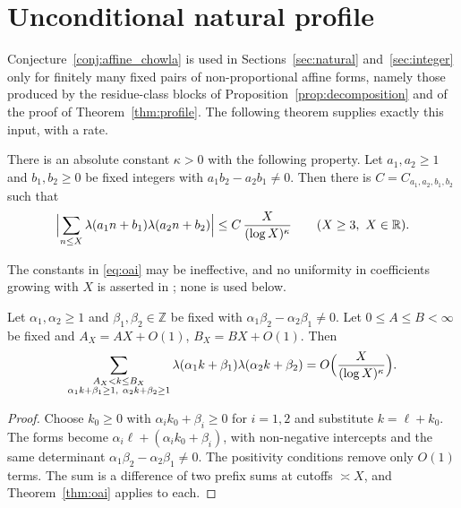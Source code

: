 \section{Unconditional natural profile}
\label{sec:unconditional}

Conjecture~\ref{conj:affine_chowla} is used in Sections~\ref{sec:natural} and~\ref{sec:integer} only for finitely many fixed pairs of non-proportional affine forms, namely those produced by the residue-class blocks of Proposition~\ref{prop:decomposition} and of the proof of Theorem~\ref{thm:profile}. The following theorem supplies exactly this input, with a rate.

\begin{theorem}
\label{thm:oai}
There is an absolute constant $\kappa>0$ with the following property. Let $a_1,a_2\ge1$ and $b_1,b_2\ge0$ be fixed integers with $a_1b_2-a_2b_1\ne0$. Then there is $C=C_{a_1,a_2,b_1,b_2}$ such that
\begin{equation}
\Bigl|\sum_{n\le X}\lambda(a_1n+b_1)\lambda(a_2n+b_2)\Bigr|\le C\,\frac{X}{(\log X)^{\kappa}}\qquad(X\ge3,\ X\in\mathbb R).
\label{eq:oai}
\end{equation}
\end{theorem}

The constants in \eqref{eq:oai} may be ineffective, and no uniformity in coefficients growing with $X$ is asserted in \cite[p.~3]{OpenAI2026}; none is used below.

\begin{lemma}
\label{lem:macro_rate}
Let $\alpha_1,\alpha_2\ge1$ and $\beta_1,\beta_2\in\mathbb Z$ be fixed with $\alpha_1\beta_2-\alpha_2\beta_1\ne0$. Let $0\le A\le B<\infty$ be fixed and $A_X=AX+O(1)$, $B_X=BX+O(1)$. Then
\begin{equation}
\sum_{\substack{A_X<k\le B_X\\ \alpha_1k+\beta_1\ge1,\ \alpha_2k+\beta_2\ge1}}\lambda(\alpha_1k+\beta_1)\lambda(\alpha_2k+\beta_2)=O\Bigl(\frac{X}{(\log X)^{\kappa}}\Bigr).
\label{eq:macro_rate}
\end{equation}
\end{lemma}

\begin{proof}
Choose $k_0\ge0$ with $\alpha_ik_0+\beta_i\ge0$ for $i=1,2$ and substitute $k=\ell+k_0$. The forms become $\alpha_i\ell+(\alpha_ik_0+\beta_i)$, with non-negative intercepts and the same determinant $\alpha_1\beta_2-\alpha_2\beta_1\ne0$. The positivity conditions remove only $O(1)$ terms. The sum is a difference of two prefix sums at cutoffs $\asymp X$, and Theorem~\ref{thm:oai} applies to each.
\end{proof}


